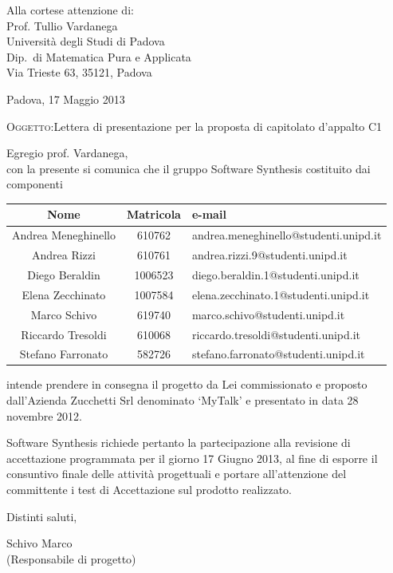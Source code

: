 \documentclass[a4paper,10pt]{letter}
\begin{document}
\begin{flushright}
\begin{minipage}[t]{.5\textwidth}
Alla cortese attenzione di:\\
Prof. Tullio Vardanega\\
Università degli Studi di Padova\\
Dip.~di Matematica Pura e Applicata\\
Via Trieste 63, 35121, Padova\\
\end{minipage}
\end{flushright}

Padova, 17 Maggio 2013

\textsc{Oggetto:}Lettera di presentazione per la proposta di capitolato d’appalto C1

\noindent{}Egregio prof. Vardanega,\\
\hspace*{11em} con la presente si comunica che il gruppo Software Synthesis costituito dai componenti

\begin{center}
\begin{tabular} {c|c|l}
{\bf Nome}&{\bf Matricola}&{\bf e-mail}\\ 
\hline
Andrea Meneghinello & 610762& andrea.meneghinello@studenti.unipd.it\\
Andrea Rizzi & 610761&andrea.rizzi.9@studenti.unipd.it\\
Diego Beraldin& 1006523& diego.beraldin.1@studenti.unipd.it\\
Elena Zecchinato&1007584&elena.zecchinato.1@studenti.unipd.it\\
Marco Schivo &619740& marco.schivo@studenti.unipd.it\\
Riccardo Tresoldi &610068 &riccardo.tresoldi@studenti.unipd.it\\
Stefano Farronato &582726&stefano.farronato@studenti.unipd.it\\
\end{tabular}
\end{center}

intende prendere in consegna il progetto da Lei commissionato e proposto dall'Azienda Zucchetti Srl denominato `MyTalk' e presentato in data 28 novembre 2012.

Software Synthesis richiede pertanto la partecipazione alla revisione di accettazione programmata per il giorno 17 Giugno 2013, al fine di esporre il consuntivo finale delle attività progettuali e portare all'attenzione del committente i test di Accettazione sul prodotto realizzato.

Distinti saluti,\\

\begin{flushright}
\begin{minipage}[t]{.35\textwidth}
Schivo Marco\\
(Responsabile di progetto)
\end{minipage}
\end{flushright}
\end{document}
